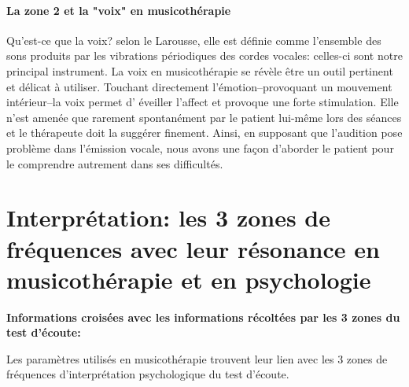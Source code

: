  \paragraph{La zone 2 et la "voix" en musicothérapie}
Qu'est-ce que la voix? selon le Larousse, elle est définie comme
l'ensemble des sons produits par les vibrations périodiques des
cordes vocales: celles-ci sont notre principal instrument.
La voix en musicothérapie se révèle être un outil pertinent et délicat
à utiliser. Touchant 
directement 
l'émotion--provoquant un mouvement intérieur--la voix permet d'
éveiller l'affect
et provoque une forte stimulation. Elle n'est amenée que rarement
spontanément par le patient lui-même lors des séances et le thérapeute doit la suggérer
finement.
Ainsi, en supposant que l'audition pose problème dans l'émission
vocale, nous avons une façon d'aborder le patient pour le comprendre autrement dans ses difficultés. 
       


\section{Interprétation: les 3 zones de fréquences avec leur résonance en musicothérapie et en
  psychologie}


	\textbf{Informations croisées avec les informations récoltées par les 3 
          zones du test d'écoute:}
          
Les paramètres utilisés en musicothérapie trouvent leur lien avec les
3 zones de fréquences d'interprétation psychologique du test d'écoute.

